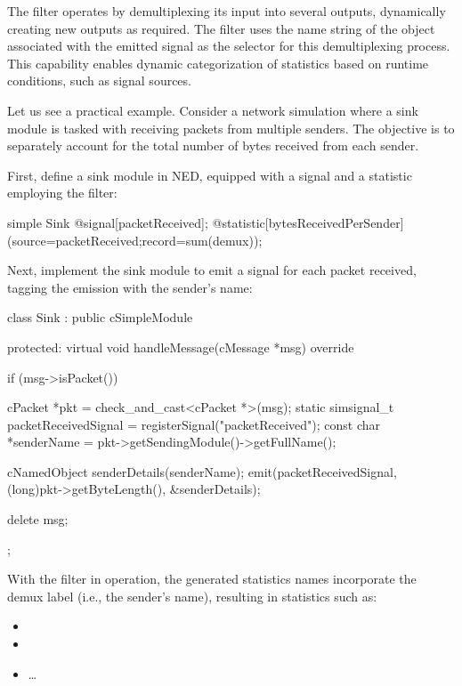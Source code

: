 The  filter operates by demultiplexing its input into several
outputs, dynamically creating new outputs as required. The filter uses the name
string of the  object associated with the emitted signal as the
selector for this demultiplexing process. This capability enables dynamic
categorization of statistics based on runtime conditions, such as signal
sources.

Let us see a practical example. Consider a network simulation where a sink
module is tasked with receiving packets from multiple senders. The objective is
to separately account for the total number of bytes received from each sender.

First, define a sink module in NED, equipped with a signal and a statistic
employing the  filter:

\begin{ned}
simple Sink {
    @signal[packetReceived];
    @statistic[bytesReceivedPerSender](source=packetReceived;record=sum(demux));
}
\end{ned}

Next, implement the sink module to emit a signal for each packet received,
tagging the emission with the sender's name:

\begin{cpp}
class Sink : public cSimpleModule {
  protected:
    virtual void handleMessage(cMessage *msg) override {
        if (msg->isPacket()) {
            cPacket *pkt = check_and_cast<cPacket *>(msg);
            static simsignal_t packetReceivedSignal = registerSignal("packetReceived");
            const char *senderName = pkt->getSendingModule()->getFullName();

            cNamedObject senderDetails(senderName);
            emit(packetReceivedSignal, (long)pkt->getByteLength(), &senderDetails);

            delete msg;
        }
    }
};
\end{cpp}

With the  filter in operation, the generated statistics names
incorporate the demux label (i.e., the sender's name), resulting in statistics
such as:

\begin{itemize}
    \item {}
    \item {}
    \item \ldots
\end{itemize}

